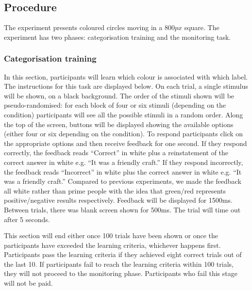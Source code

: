 \documentclass[doc, a4paper, apacite]{apa6}
\begin{document}
\subsection{Procedure}

The experiment presents coloured circles moving in a $800px$ square. 
The experiment has two phases: categorisation training and the monitoring task.

\subsubsection{Categorisation training}
In this section, participants will learn which colour is associated with which label. 
The instructions for this task are displayed below. 
On each trial, a single stimulus will be shown, on a black background. 
The order of the stimuli shown will be pseudo-randomised: for each block of four or six stimuli (depending on the condition) participants will see all the possible stimuli in a random order. 
Along the top of the screen, buttons will be displayed showing the available options (either four or six depending on the condition). 
To respond participants click on the appropriate options and then receive feedback for one second. 
If they respond correctly, the feedback reads ``Correct'' in white plus a reinstatement of the correct answer in white e.g. ``It was a friendly craft.'' 
If they respond incorrectly, the feedback reads ``Incorrect'' in white plus the correct answer in white e.g. ``It was a friendly craft.''
Compared to previous experiments, we made the feedback all white rather than prime people with the idea that green/red represents positive/negative results respectively.
Feedback will be displayed for 1500ms.
Between trials, there was blank screen shown for 500ms. 
The trial will time out after 5 seconds. 

This section will end either once 100 trials have been shown or once the participants have exceeded the learning criteria, whichever happens first. 
Participants pass the learning criteria if they achieved eight correct trials out of the last 10. 
If participants fail to reach the learning criteria within 100 trials, they will not proceed to the monitoring phase.
Participants who fail this stage will not be paid. 
\end{document}
